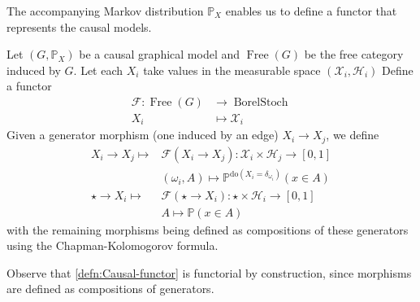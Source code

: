 \documentclass[../main.tex]{subfiles}
\begin{document}
    The accompanying Markov distribution ${\mathbb{P}_X}$ enables us to define a functor that represents the causal models. 
    \begin{defn}\label{defn:Causal-functor}
    Let ${(G, \mathbb{P}_X)}$ be a causal graphical model and ${\operatorname{Free}(G)}$ be the free category induced by ${G}$. Let each ${X_i}$ take values in the measurable space ${(\mathcal{X}_i, \mathcal{H}_i)}$    Define a functor
    \begin{align*}
         \mathcal{F}: \operatorname{Free}(G) &\to \operatorname*{BorelStoch}\\
                    X_i &\longmapsto \mathcal{X}_i 
    \end{align*}
    Given a generator morphism (one induced by an edge) ${X_i\to X_j}$, we define
    \begin{align*}
    X_i\to X_j \longmapsto &\mathcal{F}(X_i\to X_j): \mathcal{X}_i \times \mathcal{H}_j \to [0,1]\\
                    &(\omega_i, A)\mapsto \mathbb{P}^{\text{do}(X_i=\delta_{\omega_i})}(x\in A) \\
    \star \to X_i \longmapsto &\mathcal{F}(\star\to X_i): \star \times \mathcal{H}_i \to [0,1]\\
                    &A \mapsto \mathbb{P}(x\in A) 
    \end{align*}
    with the remaining morphisms being defined as compositions of these generators using the Chapman-Kolomogorov formula. 
    \end{defn}
    Observe that \autoref{defn:Causal-functor} is functorial by construction, since morphisms are defined as compositions of generators. 
\end{document}
